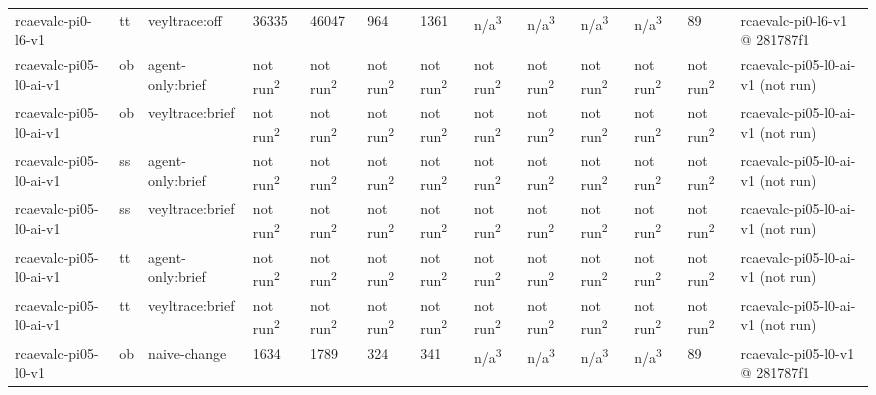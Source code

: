 \begin{table}[t]
\begin{tabular}{lllllllllllll}
rcaevalc-pi0-l6-v1 & tt & veyltrace:off & 36335 & 46047 & 964 & 1361 & n/a\textsuperscript{3} & n/a\textsuperscript{3} & n/a\textsuperscript{3} & n/a\textsuperscript{3} & 89 & rcaevalc-pi0-l6-v1 @ 281787f1 \\
rcaevalc-pi05-l0-ai-v1 & ob & agent-only:brief & not run\textsuperscript{2} & not run\textsuperscript{2} & not run\textsuperscript{2} & not run\textsuperscript{2} & not run\textsuperscript{2} & not run\textsuperscript{2} & not run\textsuperscript{2} & not run\textsuperscript{2} & not run\textsuperscript{2} & rcaevalc-pi05-l0-ai-v1 (not run) \\
rcaevalc-pi05-l0-ai-v1 & ob & veyltrace:brief & not run\textsuperscript{2} & not run\textsuperscript{2} & not run\textsuperscript{2} & not run\textsuperscript{2} & not run\textsuperscript{2} & not run\textsuperscript{2} & not run\textsuperscript{2} & not run\textsuperscript{2} & not run\textsuperscript{2} & rcaevalc-pi05-l0-ai-v1 (not run) \\
rcaevalc-pi05-l0-ai-v1 & ss & agent-only:brief & not run\textsuperscript{2} & not run\textsuperscript{2} & not run\textsuperscript{2} & not run\textsuperscript{2} & not run\textsuperscript{2} & not run\textsuperscript{2} & not run\textsuperscript{2} & not run\textsuperscript{2} & not run\textsuperscript{2} & rcaevalc-pi05-l0-ai-v1 (not run) \\
rcaevalc-pi05-l0-ai-v1 & ss & veyltrace:brief & not run\textsuperscript{2} & not run\textsuperscript{2} & not run\textsuperscript{2} & not run\textsuperscript{2} & not run\textsuperscript{2} & not run\textsuperscript{2} & not run\textsuperscript{2} & not run\textsuperscript{2} & not run\textsuperscript{2} & rcaevalc-pi05-l0-ai-v1 (not run) \\
rcaevalc-pi05-l0-ai-v1 & tt & agent-only:brief & not run\textsuperscript{2} & not run\textsuperscript{2} & not run\textsuperscript{2} & not run\textsuperscript{2} & not run\textsuperscript{2} & not run\textsuperscript{2} & not run\textsuperscript{2} & not run\textsuperscript{2} & not run\textsuperscript{2} & rcaevalc-pi05-l0-ai-v1 (not run) \\
rcaevalc-pi05-l0-ai-v1 & tt & veyltrace:brief & not run\textsuperscript{2} & not run\textsuperscript{2} & not run\textsuperscript{2} & not run\textsuperscript{2} & not run\textsuperscript{2} & not run\textsuperscript{2} & not run\textsuperscript{2} & not run\textsuperscript{2} & not run\textsuperscript{2} & rcaevalc-pi05-l0-ai-v1 (not run) \\
rcaevalc-pi05-l0-v1 & ob & naive-change & 1634 & 1789 & 324 & 341 & n/a\textsuperscript{3} & n/a\textsuperscript{3} & n/a\textsuperscript{3} & n/a\textsuperscript{3} & 89 & rcaevalc-pi05-l0-v1 @ 281787f1 \\

\end{tabular}
\end{table}
